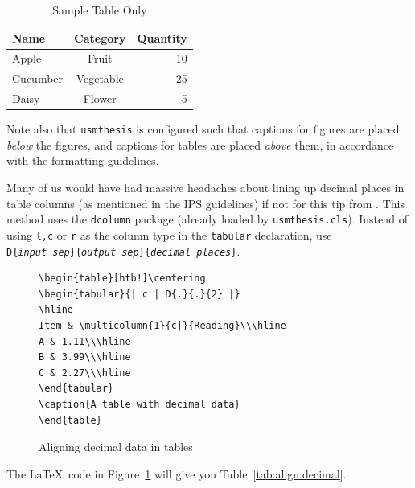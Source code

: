 \begin{table}[hbt!]\centering
  \begin{tabular}{| l | c || r |}
    \hline
    \textbf{Name} & \textbf{Category} & \textbf{Quantity} \\
    \hline\hline
    Apple         & Fruit             & 10                \\
    \hline
    Cucumber      & Vegetable         & 25                \\
    \hline
    Daisy         & Flower            & 5                 \\
    \hline
  \end{tabular}
  \caption{Sample Table Only} \label{table:sample}
\end{table}

Note also that \verb|usmthesis| is configured such that captions for figures are placed \emph{below} the figures, and captions for tables are placed \emph{above} them, in accordance with the formatting guidelines.

Many of us would have had massive headaches about lining up decimal places in table columns (as mentioned in the IPS guidelines) if not for this tip from \citep[pp.~274--276]{latex:companion}. This method uses the \verb|dcolumn| package (already loaded by \verb|usmthesis.cls|). Instead of using \verb|l,c| or \verb|r| as the column type in the \verb|tabular| declaration, use\\ \texttt{D\{\textit{input sep}\}\{\textit{output sep}\}\{\textit{decimal places}\}}.

\begin{figure}[htb!]
  \begin{lstlisting}
\begin{table}[htb!]\centering
\begin{tabular}{| c | D{.}{.}{2} |}
\hline
Item & \multicolumn{1}{c|}{Reading}\\\hline
A & 1.11\\\hline
B & 3.99\\\hline
C & 2.27\\\hline
\end{tabular}
\caption{A table with decimal data}
\end{table}
\end{lstlisting}
  \caption{Aligning decimal data in tables}\label{fig:align:decimal}
\end{figure}

The \LaTeX\ code in Figure~\ref{fig:align:decimal} will give you Table~\ref{tab:align:decimal}.

